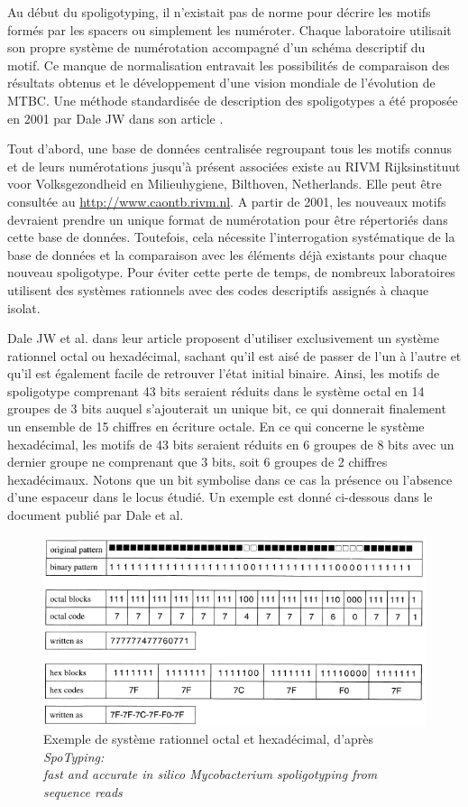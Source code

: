 \documentclass[twoside,a4paper,11pt,frenchb,openany]{report}
\begin{document}
Au début du spoligotyping, il n'existait pas de norme pour décrire les motifs formés par les spacers ou simplement les numéroter. Chaque laboratoire utilisait son propre système de numérotation accompagné d'un schéma descriptif du motif. Ce manque de normalisation entravait les possibilités de comparaison des résultats obtenus et le développement d'une vision mondiale de l'évolution de MTBC. Une méthode standardisée de description des spoligotypes a été proposée en 2001 par Dale JW dans son article \cite{dale}. 

Tout d'abord, une base de données centralisée regroupant tous les motifs connus et de leurs numérotations jusqu'à présent associées existe au RIVM Rijksinstituut voor Volksgezondheid en Milieuhygiene, Bilthoven, Netherlands. Elle peut être consultée au \url{http://www.caontb.rivm.nl}. A partir de 2001, les nouveaux motifs devraient prendre un unique format de numérotation pour être répertoriés dans cette base de données. Toutefois, cela nécessite l'interrogation systématique de la base de données et la comparaison avec les éléments déjà existants pour chaque nouveau spoligotype. Pour éviter cette perte de temps, de nombreux laboratoires utilisent des systèmes rationnels avec des codes descriptifs assignés à chaque isolat. 

Dale JW et al. dans leur article \cite{dale} proposent d'utiliser exclusivement un système rationnel octal ou hexadécimal, sachant qu'il est aisé de passer de l'un à l'autre et qu'il est également facile de retrouver l'état initial binaire. Ainsi, les motifs de spoligotype comprenant 43 bits seraient réduits dans le système octal en 14 groupes de 3 bits auquel s'ajouterait un unique bit, ce qui donnerait finalement un ensemble de 15 chiffres en écriture octale. En ce qui concerne le système hexadécimal, les motifs de 43 bits seraient réduits en 6 groupes de 8 bits avec un dernier groupe ne comprenant que 3 bits, soit 6 groupes de 2 chiffres hexadécimaux. Notons que un bit symbolise dans ce cas la présence ou l'absence d'une espaceur dans le locus étudié. Un exemple est donné ci-dessous dans le document \cite{dale} publié par Dale et al.

\begin{figure}

\includegraphics[scale=0.6]{hexa.png}
\caption{Exemple de système rationnel octal et hexadécimal, d'après \textit{SpoTyping:\\ fast and accurate in silico Mycobacterium spoligotyping from sequence reads}}
\end{figure}
\end{document}
